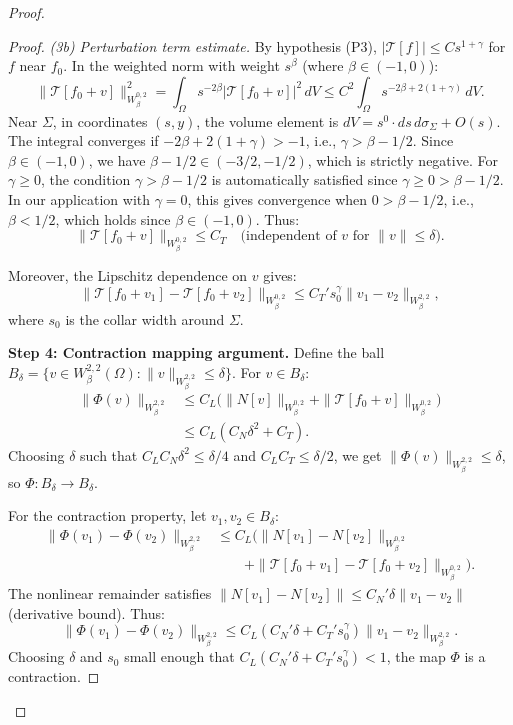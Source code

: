 \documentclass[12pt]{article}
\theoremstyle{plain}
\theoremstyle{definition}
\theoremstyle{remark}
\begin{document}
\begin{proof}
\begin{proof}
\textit{(3b) Perturbation term estimate.} By hypothesis (P3), $|\mathcal{T}[f]| \leq C s^{1+\gamma}$ for $f$ near $f_0$. In the weighted norm with weight $s^\beta$ (where $\beta \in (-1, 0)$):
\[
\|\mathcal{T}[f_0 + v]\|_{W^{0,2}_\beta}^2 = \int_\Omega s^{-2\beta} |\mathcal{T}[f_0+v]|^2 \, dV \leq C^2 \int_\Omega s^{-2\beta + 2(1+\gamma)} \, dV.
\]
Near $\Sigma$, in coordinates $(s, y)$, the volume element is $dV = s^0 \cdot ds \, d\sigma_\Sigma + O(s)$. The integral converges if $-2\beta + 2(1+\gamma) > -1$, i.e., $\gamma > \beta - 1/2$. Since $\beta \in (-1, 0)$, we have $\beta - 1/2 \in (-3/2, -1/2)$, which is strictly negative. For $\gamma \geq 0$, the condition $\gamma > \beta - 1/2$ is automatically satisfied since $\gamma \geq 0 > \beta - 1/2$. In our application with $\gamma = 0$, this gives convergence when $0 > \beta - 1/2$, i.e., $\beta < 1/2$, which holds since $\beta \in (-1, 0)$. Thus:
\[
\|\mathcal{T}[f_0 + v]\|_{W^{0,2}_\beta} \leq C_T \quad \text{(independent of } v \text{ for } \|v\| \leq \delta).
\]

Moreover, the Lipschitz dependence on $v$ gives:
\[
\|\mathcal{T}[f_0 + v_1] - \mathcal{T}[f_0 + v_2]\|_{W^{0,2}_\beta} \leq C_T' s_0^{\gamma} \|v_1 - v_2\|_{W^{2,2}_\beta},
\]
where $s_0$ is the collar width around $\Sigma$.

\textbf{Step 4: Contraction mapping argument.}
Define the ball $B_\delta = \{v \in W^{2,2}_\beta(\Omega) : \|v\|_{W^{2,2}_\beta} \leq \delta\}$. For $v \in B_\delta$:
\begin{align}
\|\Phi(v)\|_{W^{2,2}_\beta} &\leq C_L \bigl(\|N[v]\|_{W^{0,2}_\beta} + \|\mathcal{T}[f_0+v]\|_{W^{0,2}_\beta}\bigr) \\
&\leq C_L (C_N \delta^2 + C_T).
\end{align}
Choosing $\delta$ such that $C_L C_N \delta^2 \leq \delta/4$ and $C_L C_T \leq \delta/2$, we get $\|\Phi(v)\|_{W^{2,2}_\beta} \leq \delta$, so $\Phi: B_\delta \to B_\delta$.

For the contraction property, let $v_1, v_2 \in B_\delta$:
\begin{align*}
\|\Phi(v_1) - \Phi(v_2)\|_{W^{2,2}_\beta} &\leq C_L \bigl(\|N[v_1] - N[v_2]\|_{W^{0,2}_\beta} \\
&\qquad + \|\mathcal{T}[f_0+v_1] - \mathcal{T}[f_0+v_2]\|_{W^{0,2}_\beta}\bigr).
\end{align*}
The nonlinear remainder satisfies $\|N[v_1] - N[v_2]\| \leq C_N' \delta \|v_1 - v_2\|$ (derivative bound). Thus:
\[
\|\Phi(v_1) - \Phi(v_2)\|_{W^{2,2}_\beta} \leq C_L(C_N' \delta + C_T' s_0^\gamma)\|v_1 - v_2\|_{W^{2,2}_\beta}.
\]
Choosing $\delta$ and $s_0$ small enough that $C_L(C_N' \delta + C_T' s_0^\gamma) < 1$, the map $\Phi$ is a contraction.


\end{proof}
\end{proof}
\end{document}
